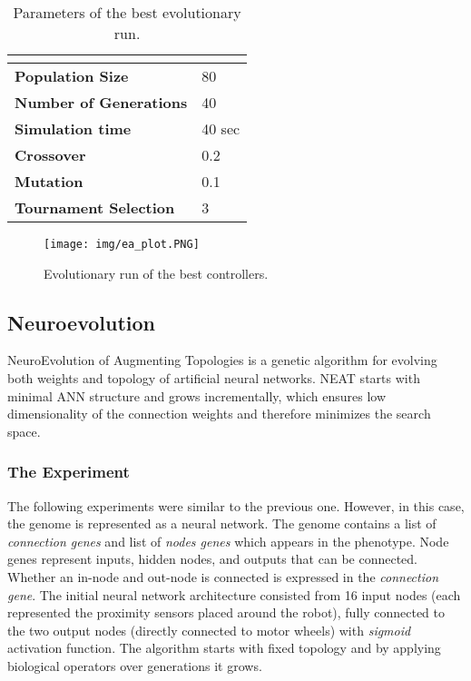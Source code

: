\documentclass[format=acmsmall, review=false, screen=true]{acmart}
\begin{document}
\begin{table}[H]
\begin{tabular}{ll}
\hline
\textbf{}                      & \textbf{} \\ \hline
\textbf{Population Size}       & 80        \\
\textbf{Number of Generations} & 40        \\
\textbf{Simulation time}       & 40 sec    \\
\textbf{Crossover}             & 0.2       \\
\textbf{Mutation}              & 0.1       \\
\textbf{Tournament Selection}  & 3        
\end{tabular}
\caption{Parameters of the best evolutionary run.}
\label{table:experiment_2}
\end{table}

\begin{figure}[H]
  \texttt{[image: img/ea\_plot.PNG]}
  \caption{Evolutionary run of the best controllers.}
  \label{fig:ea_results}
\end{figure}

\subsection{Neuroevolution}

NeuroEvolution of Augmenting Topologies \cite{stanley2002evolving} is a genetic algorithm for evolving both weights and topology of artificial neural networks. NEAT starts with minimal ANN structure and grows incrementally, which ensures low dimensionality of the connection weights and therefore minimizes the search space.

\subsubsection{The Experiment}

The following experiments were similar to the previous one. However, in this case, the genome is represented as a neural network. The genome contains a list of \emph{connection genes} and list of \emph{nodes genes} which appears in the phenotype. Node genes represent inputs, hidden nodes, and outputs that can be connected. Whether an in-node and out-node is connected is expressed in the \emph{connection gene}. The initial neural network architecture consisted from 16 input nodes (each represented the proximity sensors placed around the robot), fully connected to the two output nodes (directly connected to motor wheels) with \emph{sigmoid} activation function. The algorithm starts with fixed topology and by applying biological operators over generations it grows. 
\end{document}
